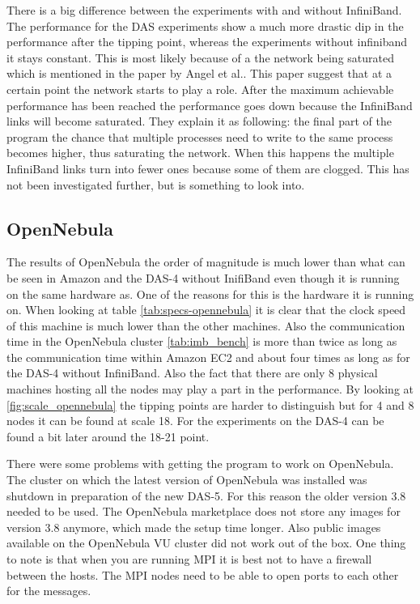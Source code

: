 There is a big difference between the experiments with and without InfiniBand. The performance for the DAS experiments show a much more drastic dip in the performance after the tipping point, whereas the experiments without infiniband it stays constant. This is most likely because of a the network being saturated which is mentioned in the paper by Angel et al.\cite{angel2012graph}. This paper suggest that at a certain point the network starts to play a role.  After the maximum achievable performance has been reached the performance goes down because the InfiniBand links will become saturated. They explain it as following: the final part of the program the chance that multiple processes need to write to the same process becomes higher, thus saturating the network. When this happens the multiple InfiniBand links turn into fewer ones because some of them are clogged. This has not been investigated further, but is something to look into. 

\subsection{OpenNebula}
The results of OpenNebula the order of magnitude is much lower than what can be seen in Amazon and the DAS-4 without InifiBand even though it is running on the same hardware as. One of the reasons for this is the hardware it is running on. When looking at table \ref{tab:specs-opennebula} it is clear that the clock speed of this machine is much lower than the other machines. Also the communication time in the OpenNebula cluster \ref{tab:imb_bench} is more than twice as long as the communication time within Amazon EC2 and about four times as long as for the DAS-4 without InfiniBand. Also the fact that there are only 8 physical machines hosting all the nodes may play a part in the performance. By looking at \ref{fig:scale_opennebula} the tipping points are harder to distinguish but for 4 and 8 nodes it can be found at scale 18. For the experiments on the DAS-4 can be found a bit later around the 18-21 point.

There were some problems with getting the program to work on OpenNebula. The cluster on which the latest version of OpenNebula was installed was shutdown in preparation of the new DAS-5. For this reason the older version 3.8 needed to be used. The OpenNebula marketplace does not store any images for version 3.8 anymore, which made the setup time longer. Also public images available on the OpenNebula VU cluster did not work out of the box.
One thing to note is that when you are running MPI it is best not to have a firewall between the hosts. The MPI nodes need to be able to open ports to each other for the messages.  

